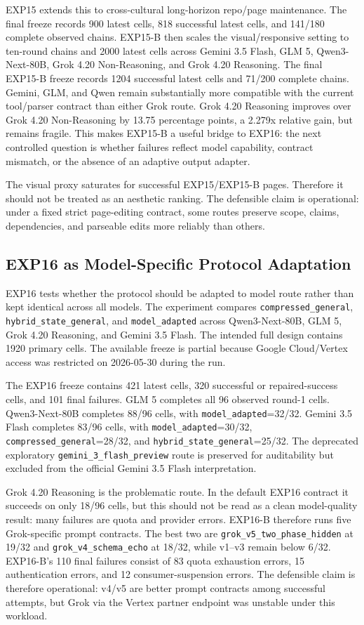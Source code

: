 \documentclass[11pt]{article}
\begin{document}
EXP15 extends this to cross-cultural long-horizon repo/page maintenance. The final freeze records 900 latest cells, 818 successful latest cells, and 141/180 complete observed chains. EXP15-B then scales the visual/responsive setting to ten-round chains and 2000 latest cells across Gemini 3.5 Flash, GLM 5, Qwen3-Next-80B, Grok 4.20 Non-Reasoning, and Grok 4.20 Reasoning. The final EXP15-B freeze records 1204 successful latest cells and 71/200 complete chains. Gemini, GLM, and Qwen remain substantially more compatible with the current tool/parser contract than either Grok route. Grok 4.20 Reasoning improves over Grok 4.20 Non-Reasoning by 13.75 percentage points, a 2.279x relative gain, but remains fragile. This makes EXP15-B a useful bridge to EXP16: the next controlled question is whether failures reflect model capability, contract mismatch, or the absence of an adaptive output adapter.

The visual proxy saturates for successful EXP15/EXP15-B pages. Therefore it should not be treated as an aesthetic ranking. The defensible claim is operational: under a fixed strict page-editing contract, some routes preserve scope, claims, dependencies, and parseable edits more reliably than others.

\subsection{EXP16 as Model-Specific Protocol Adaptation}
EXP16 tests whether the protocol should be adapted to model route rather than kept identical across all models. The experiment compares \texttt{compressed\_general}, \texttt{hybrid\_state\_general}, and \texttt{model\_adapted} across Qwen3-Next-80B, GLM 5, Grok 4.20 Reasoning, and Gemini 3.5 Flash. The intended full design contains 1920 primary cells. The available freeze is partial because Google Cloud/Vertex access was restricted on 2026-05-30 during the run.

The EXP16 freeze contains 421 latest cells, 320 successful or repaired-success cells, and 101 final failures. GLM 5 completes all 96 observed round-1 cells. Qwen3-Next-80B completes 88/96 cells, with \texttt{model\_adapted}=32/32. Gemini 3.5 Flash completes 83/96 cells, with \texttt{model\_adapted}=30/32, \texttt{compressed\_general}=28/32, and \texttt{hybrid\_state\_general}=25/32. The deprecated exploratory \texttt{gemini\_3\_flash\_preview} route is preserved for auditability but excluded from the official Gemini 3.5 Flash interpretation.

Grok 4.20 Reasoning is the problematic route. In the default EXP16 contract it succeeds on only 18/96 cells, but this should not be read as a clean model-quality result: many failures are quota and provider errors. EXP16-B therefore runs five Grok-specific prompt contracts. The best two are \texttt{grok\_v5\_two\_phase\_hidden} at 19/32 and \texttt{grok\_v4\_schema\_echo} at 18/32, while v1--v3 remain below 6/32. EXP16-B's 110 final failures consist of 83 quota exhaustion errors, 15 authentication errors, and 12 consumer-suspension errors. The defensible claim is therefore operational: v4/v5 are better prompt contracts among successful attempts, but Grok via the Vertex partner endpoint was unstable under this workload.
\end{document}
